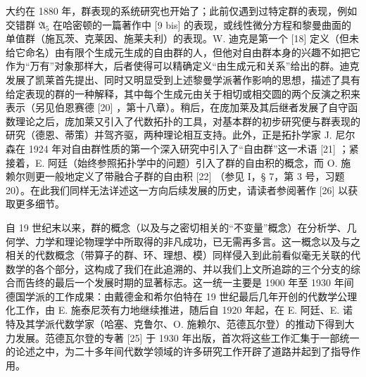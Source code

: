 大约在 1880 年，群表现的系统研究也开始了；此前仅遇到过特定群的表现，例如交错群 \(\mathfrak{A}_5\) 在哈密顿的一篇著作中 {[}9 bis{]} 的表现，或线性微分方程和黎曼曲面的单值群（施瓦茨、克莱因、施莱夫利）的表现。W. 迪克是第一个 {[}18{]} 定义（但未给它命名）由有限个生成元生成的自由群的人，但他对自由群本身的兴趣不如把它作为“万有”对象那样大，后者使得可以精确定义“由生成元和关系”给出的群。迪克发展了凯莱首先提出、同时又明显受到上述黎曼学派著作影响的思想，描述了具有给定表现的群的一种解释，其中每个生成元由关于相切或相交圆的两个反演之积来表示（另见伯恩赛德 {[}20{]} ，第十八章）。稍后，在庞加莱及其后继者发展了自守函数理论之后，庞加莱又引入了代数拓扑的工具，对基本群的初步研究便与群表现的研究（德恩、蒂策）并驾齐驱，两种理论相互支持。此外，正是拓扑学家 J. 尼尔森在 1924 年对自由群性质的第一个深入研究中引入了“自由群”这一术语 {[}21{]} ；紧接着，E. 阿廷（始终参照拓扑学中的问题）引入了群的自由积的概念，而 O. 施赖尔则更一般地定义了带融合子群的自由积 {[}22{]} （参见 I，§ 7，第 3 号，习题 20）。在此我们同样无法详述这一方向后续发展的历史，请读者参阅著作 {[}26{]} 以获取更多细节。

自 19 世纪末以来，群的概念（以及与之密切相关的“不变量”概念）在分析学、几何学、力学和理论物理学中所取得的非凡成功，已无需再多言。这一概念以及与之相关的代数概念（带算子的群、环、理想、模）同样侵入到此前看似毫无关联的代数学的各个部分，这构成了我们在此追溯的、并以我们上文所追踪的三个分支的综合而告终的最后一个发展时期的显著标志。这一统一主要是 1900 年至 1930 年间德国学派的工作成果：由戴德金和希尔伯特在 19 世纪最后几年开创的代数学公理化工作，由 E. 施泰尼茨有力地继续推进，随后自 1920 年起，在 E. 阿廷、E. 诺特及其学派代数学家（哈塞、克鲁尔、O. 施赖尔、范德瓦尔登）的推动下得到大力发展。范德瓦尔登的专著 {[}25{]} 于 1930 年出版，首次将这些工作汇集于一部统一的论述之中，为二十多年间代数学领域的许多研究工作开辟了道路并起到了指导作用。

